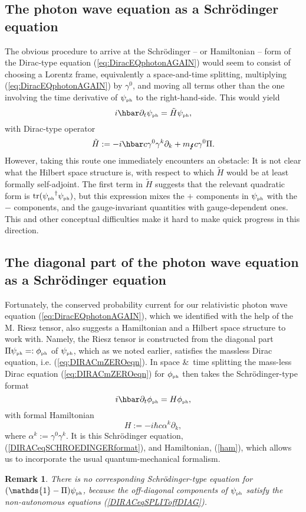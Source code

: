 \documentclass[12pt]{article}
\theoremstyle{definition}
\newtheorem{rem}[thm]{Remark}
\DeclareMathOperator{\tr}{tr}
\newcommand{\refeq}[1]{(\ref{#1})}
\numberwithin{equation}{section}
\newcommand{\beq}{\begin{equation}}
\newcommand{\eeq}{\end{equation}}
\newcommand{\Id}{\mathds{1}}
\newcommand{\p}{\partial}
\newcommand{\psiPH}{{\psi_{\mbox{\rm\tiny ph}}}}
\newcommand{\phiPH}{{\phi_{\mbox{\rm\tiny ph}}}}
\newcommand{\mPH}{{m_{\mbox{\Lightning}}}}
\newcommand{\al}{\alpha}
\newcommand{\ga}{\gamma}
\begin{document}
\subsection{The photon wave equation as a Schr\"odinger equation}\label{sec:schrodA}\vspace{-5pt}
 The obvious procedure to arrive at the Schr\"odinger -- or Hamiltonian -- form of the Dirac-type equation
\refeq{eq:DiracEQphotonAGAIN} would seem to consist of choosing a Lorentz frame, equivalently a space-and-time splitting, 
multiplying \refeq{eq:DiracEQphotonAGAIN} by $\ga^0$, and moving all terms other than the one involving the time 
derivative of $\psiPH$ to the right-hand-side. 
 This would yield
\beq\label{eq:SCHROEDfull}
i\hbar \p_{t} \psiPH = 
\tilde{H}\psiPH,
\eeq
with Dirac-type operator
\beq\label{eq:Hamfull}
\tilde{H} := -i\hbar c \ga^0 \ga^k \p_k + \mPH c \ga^0 \Pi.
\eeq
 However, taking this route one immediately encounters an obstacle: 
 It is not clear what the Hilbert space structure is, with respect to which 
$\tilde{H}$
would be at least formally self-adjoint. 
 The first term in 
$\tilde{H}$ suggests that the relevant quadratic form is $ \tr( \psiPH^\dag \psiPH )$, 
but this expression mixes the $+$ components in $\psiPH$ with the $-$ components, and the gauge-invariant quantities with gauge-dependent ones. 
This and other conceptual difficulties make it hard to make quick progress in this direction.\vspace{-5pt}

%
\subsection{The diagonal part of the photon wave equation as a Schr\"odinger equation}\label{sec:schrodB}\vspace{-5pt}
Fortunately, the conserved probability current for our relativistic photon wave equation \refeq{eq:DiracEQphotonAGAIN}, 
which we identified with the help of the M. Riesz tensor, also suggests a Hamiltonian and a Hilbert space 
structure to work with.
 Namely, the Riesz tensor is constructed from the diagonal part $\Pi\psiPH =: \phiPH$ of $\psiPH$, which
as we noted earlier, satisfies the massless Dirac equation, i.e. \refeq{eq:DIRACmZEROeqn}.
 In space \&\ time splitting the mass-less Dirac equation \refeq{eq:DIRACmZEROeqn} for $\phiPH$ then
takes the Schr\"odinger-type format
\beq 
\label{DIRACeqSCHROEDINGERformat}
i\hbar \p_t \phiPH = H\phiPH,
\eeq
with formal Hamiltonian 
\beq \label{ham}
H 
:=  -i\hbar c \al^k \p_k,
\eeq
where $\al^k := \ga^0\ga^k$.
 It is this Schr\"odinger equation, \refeq{DIRACeqSCHROEDINGERformat}, 
and Hamiltonian, \refeq{ham}, which allows us to incorporate the usual quantum-mechanical formalism.
%
\begin{rem}
\textit{There is no corresponding Schr\"odinger-type equation for $(\Id - \Pi)\psiPH$, because the off-diagonal components of $\psiPH$ 
satisfy the non-autonomous equations \refeq{DIRACeqSPLIToffDIAG}.}
\end{rem}
\end{document}
